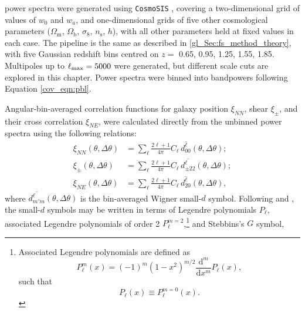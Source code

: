 \ttp{} power spectra were generated using \texttt{CosmoSIS} \citep{Zuntz2015}, covering a two-dimensional grid of values of $w_0$ and $w_a$, and one-dimensional grids of five other cosmological parameters ($\Omega_\text{m}$, $\Omega_\text{b}$, $\sigma_8$, $n_\text{s}$, $h$), with all other parameters held at fixed values in each case.
The pipeline is the same as described in \autoref{gl_Sec:fs_method_theory}, with five Gaussian redshift bins centred on $z =$ 0.65, 0.95, 1.25, 1.55, 1.85. Multipoles up to $\ell_\text{max} = 5000$ were generated, but different scale cuts are explored in this chapter.
Power spectra were binned into bandpowers following Equation \eqref{cov_eqn:pbl}.

Angular-bin-averaged correlation functions for galaxy position $\xi_{NN}$, shear $\xi_\pm$, and their cross correlation $\xi_{NE}$, were calculated directly from the unbinned power spectra using the following relations:
\begin{align}
\xi_{NN} \left( \theta, \Delta \theta \right) &= \sum_\ell
\frac{2 \ell + 1}{4 \pi} C_\ell \,
\overline{d^\ell_{00}} \left( \theta, \Delta \theta \right);
\\
\xi_\pm \left( \theta, \Delta \theta \right) &= \sum_\ell
\frac{2 \ell + 1}{4 \pi} C_\ell \,
\overline{d^\ell_{\pm22}} \left( \theta, \Delta \theta \right);
\\
\xi_{NE} \left( \theta, \Delta \theta \right) &= \sum_\ell
\frac{2 \ell + 1}{4 \pi} C_\ell \,
\overline{d^\ell_{20}} \left( \theta, \Delta \theta \right),
\end{align}
where $\overline{d^\ell_{m' m}} \left( \theta, \Delta \theta \right)$ is the bin-averaged Wigner small-$d$ symbol. Following \citet{Fang2020b} and \citet{Stebbins1996}, the small-$d$ symbols may be written in terms of Legendre polynomials $P_\ell$, associated Legendre polynomials of order 2 $P_\ell^{m = 2}$,\footnote{Associated Legendre polynomials are defined as
\begin{equation}
P_\ell^m \left( x \right) =
\left( -1 \right)^m
\left( 1 - x^2 \right)^{m/2}
\frac{\text{d}^m}{\text{d}x^m}
P_\ell \left( x \right),
\end{equation}
such that
\begin{equation}
P_\ell \left( x \right) \equiv
P_\ell^{m = 0} \left( x \right).
\end{equation}} and Stebbins's $G$ symbol,
